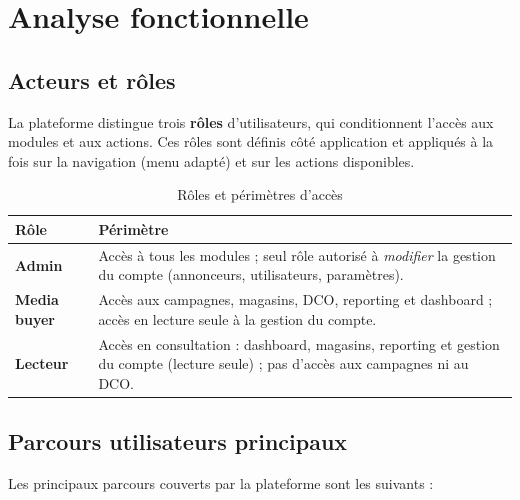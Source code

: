 \chapter{Analyse fonctionnelle}

\section{Acteurs et rôles}

La plateforme distingue trois \textbf{rôles} d'utilisateurs, qui conditionnent
l'accès aux modules et aux actions. Ces rôles sont définis côté application et
appliqués à la fois sur la navigation (menu adapté) et sur les actions
disponibles.

\begin{table}[H]
\centering
\caption{Rôles et périmètres d'accès}
\label{tab:roles}
\begin{tabularx}{\textwidth}{@{}p{3cm}L@{}}
\toprule
\textbf{Rôle} & \textbf{Périmètre} \\
\midrule
\textbf{Admin} & Accès à tous les modules ; seul rôle autorisé à \emph{modifier} la gestion du compte (annonceurs, utilisateurs, paramètres). \\
\textbf{Media buyer} & Accès aux campagnes, magasins, DCO, reporting et dashboard ; accès en lecture seule à la gestion du compte. \\
\textbf{Lecteur} & Accès en consultation : dashboard, magasins, reporting et gestion du compte (lecture seule) ; pas d'accès aux campagnes ni au DCO. \\
\bottomrule
\end{tabularx}
\end{table}

\section{Parcours utilisateurs principaux}

Les principaux parcours couverts par la plateforme sont les suivants :

